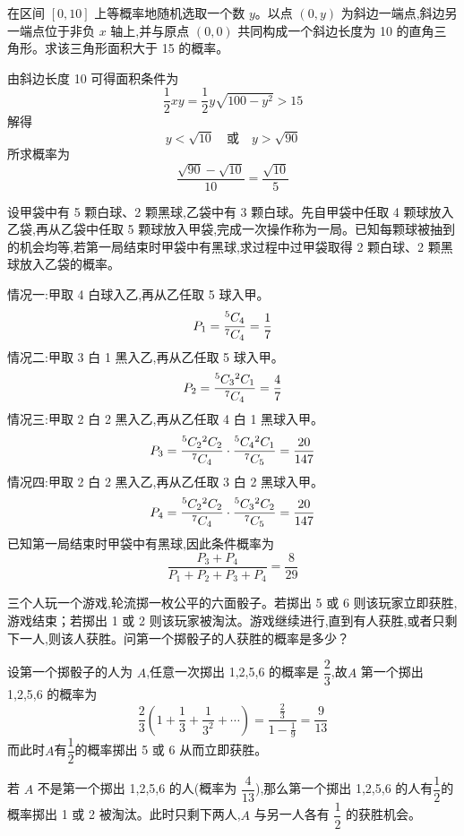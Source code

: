 \begin{questions}
    \question 在区间 $[0,10]$ 上等概率地随机选取一个数 $y$。以点 $(0,y)$ 为斜边一端点,斜边另一端点位于非负 $x$ 轴上,并与原点 $(0,0)$ 共同构成一个斜边长度为 10 的直角三角形。求该三角形面积大于 15 的概率。
    \begin{solution}
        由斜边长度 10 可得面积条件为
        \[
        \frac{1}{2} xy = \frac{1}{2} y\sqrt{100-y^2} > 15 
        \]
        解得
        \[
        y < \sqrt{10} \quad \text{或} \quad y> \sqrt{90}
        \]
        所求概率为
        \[
        \frac{\sqrt{90}-\sqrt{10}}{10} = \frac{\sqrt{10}}{5}
        \]
    \end{solution}

    \question 设甲袋中有 5 颗白球、2 颗黑球,乙袋中有 3 颗白球。先自甲袋中任取 4 颗球放入乙袋,再从乙袋中任取 5 颗球放入甲袋,完成一次操作称为一局。已知每颗球被抽到的机会均等,若第一局结束时甲袋中有黑球,求过程中过甲袋取得 2 颗白球、2 颗黑球放入乙袋的概率。
    \begin{solution}
        情况一:甲取 4 白球入乙,再从乙任取 5 球入甲。  
        \[
        P_1 = \frac{{}^{5}C_{4}}{{}^{7}C_{4}} = \frac{1}{7}
        \]
        情况二:甲取 3 白 1 黑入乙,再从乙任取 5 球入甲。  
        \[
        P_2 = \frac{{}^{5}C_{3}{}^{2}C_{1}}{{}^{7}C_{4}} = \frac{4}{7}
        \]
        情况三:甲取 2 白 2 黑入乙,再从乙任取 4 白 1 黑球入甲。  
        \[
        P_3 = \frac{{}^{5}C_{2}{}^{2}C_{2}}{{}^{7}C_{4}} \cdot \frac{{}^{5}C_{4}{}^{2}C_{1}}{{}^{7}C_{5}} = \frac{20}{147}
        \]
        情况四:甲取 2 白 2 黑入乙,再从乙任取 3 白 2 黑球入甲。  
        \[
        P_4 = \frac{{}^{5}C_{2}{}^{2}C_{2}}{{}^{7}C_{4}} \cdot \frac{{}^{5}C_{3}{}^{2}C_{2}}{{}^{7}C_{5}} = \frac{20}{147}
        \]
        已知第一局结束时甲袋中有黑球,因此条件概率为
        \[
        \frac{P_3+P_4}{P_1+P_2+P_3+P_4} = \frac{8}{29}
        \]
    \end{solution}

    \question 三个人玩一个游戏,轮流掷一枚公平的六面骰子。若掷出 5 或 6 则该玩家立即获胜,游戏结束；若掷出 1 或 2 则该玩家被淘汰。游戏继续进行,直到有人获胜,或者只剩下一人,则该人获胜。问第一个掷骰子的人获胜的概率是多少？
    \begin{solution}
        设第一个掷骰子的人为 $A$,任意一次掷出 1,2,5,6 的概率是 $\dfrac{2}{3}$,故$A$ 第一个掷出 1,2,5,6 的概率为
        \[
        \frac{2}{3}\left(1+\frac{1}{3}+\frac{1}{3^2}+\cdots\right)=\frac{\frac{2}{3}}{1-\frac{1}{9}}=\frac{9}{13}
        \]
        而此时$A$有$\dfrac{1}{2}$的概率掷出 5 或 6 从而立即获胜。

        若 $A$ 不是第一个掷出 1,2,5,6 的人(概率为 $\dfrac{4}{13}$),那么第一个掷出 1,2,5,6 的人有$\dfrac{1}{2}$的概率掷出 1 或 2 被淘汰。此时只剩下两人,$A$ 与另一人各有 $\dfrac{1}{2}$ 的获胜机会。


\end{solution}
\end{questions}
